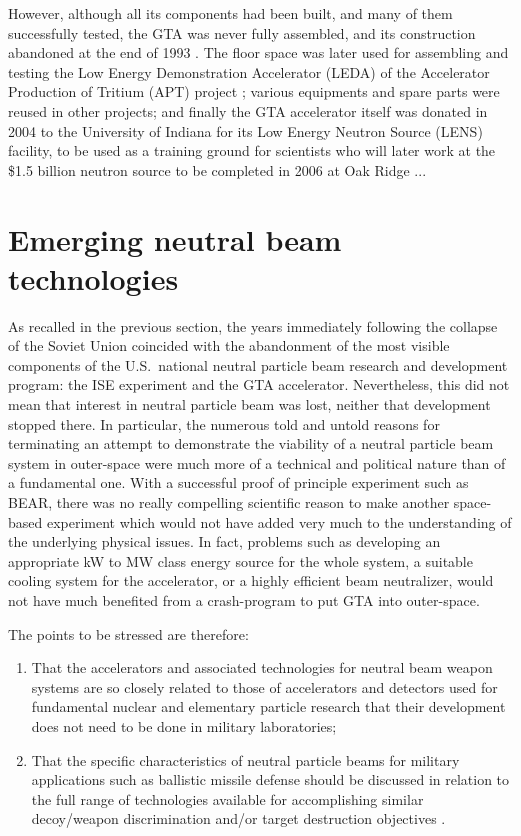 \documentclass [12pt,a4paper,     ]{report} %
\begin{document}
However, although all its components had been built, and many of them successfully tested, the GTA was never fully assembled, and its construction abandoned at the end of 1993 \cite{MARSH1994-}.  The floor space was later used for assembling and testing the Low Energy Demonstration Accelerator (LEDA) of the Accelerator Production of Tritium (APT) project \cite{SCHNE1996-}; various equipments and spare parts were reused in other projects;  and finally the GTA accelerator itself was donated in 2004 to the University of Indiana for its Low Energy Neutron Source (LENS) facility, to be used as a training ground for scientists who will later work at the \$1.5 billion neutron source to be completed in 2006 at Oak Ridge \cite{RINCK2004-}...


\section{Emerging neutral beam technologies}
\label{eme:0}

As recalled in the previous section, the years immediately following the collapse of the Soviet Union coincided with the abandonment of the most visible components of the U.S.\ national neutral particle beam research and development program: the ISE experiment and the GTA accelerator. Nevertheless, this did not mean that interest in neutral particle beam was lost, neither that development stopped there.  In particular, the numerous told and untold reasons for terminating an attempt to demonstrate the viability of a neutral particle beam system in outer-space were much more of a technical and political nature than of a fundamental one.  With a successful proof of principle experiment such as BEAR, there was no really compelling scientific reason to make another space-based experiment which would not have added very much to the understanding of the underlying physical issues.  In fact, problems such as developing an appropriate kW to MW class energy source for the whole system, a suitable cooling system for the accelerator, or a highly efficient beam neutralizer, would not have much benefited from a crash-program to put GTA into outer-space.

The points to be stressed are therefore:
\begin{enumerate}

\item That the accelerators and associated technologies for neutral beam weapon systems are so closely related to those of accelerators and detectors used for fundamental nuclear and elementary particle research that their development does not need to be done in military laboratories;

\item  That the specific characteristics of neutral particle beams for military applications such as ballistic missile defense should be discussed in relation to the full range of technologies available for accomplishing similar decoy/weapon discrimination and/or target destruction objectives \cite{GSPON2000-}.

\end{enumerate}
\end{document}
